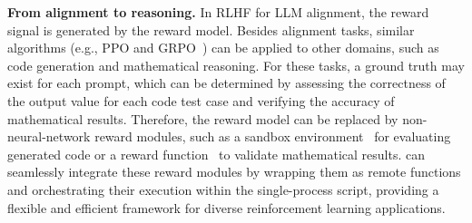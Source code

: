 \noindent \textbf{From alignment to reasoning.}
In RLHF for LLM alignment, the reward signal is generated by the reward model. Besides alignment tasks, similar algorithms (e.g., PPO and GRPO~\cite{shao2024deepseekmath}) can be applied to other domains, such as code generation and mathematical reasoning. 
For these tasks, a ground truth may exist for each prompt, which can be determined by assessing the correctness of the output value for each code test case and verifying the accuracy of mathematical results.
Therefore, the reward model can be replaced by non-neural-network reward modules, such as a sandbox environment~\cite{zhangframework} for evaluating generated code or a reward function~\cite{cobbe2021gsm8k, 2019math} to validate mathematical results. \sysname{} can seamlessly integrate these reward modules by wrapping them as remote functions and orchestrating their execution within the single-process script, providing a flexible and efficient framework for diverse reinforcement learning applications.



















